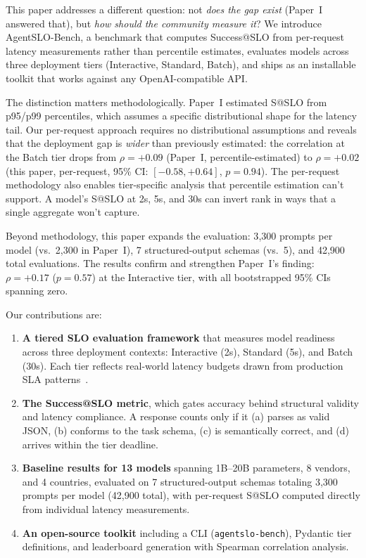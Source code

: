 \documentclass[11pt]{article}
\begin{document}
This paper addresses a different question: not \emph{does the gap exist} (Paper~I answered that), but \emph{how should the community measure it}?  We introduce AgentSLO-Bench, a benchmark that computes Success@SLO from per-request latency measurements rather than percentile estimates, evaluates models across three deployment tiers (Interactive, Standard, Batch), and ships as an installable toolkit that works against any OpenAI-compatible API.

The distinction matters methodologically.  Paper~I estimated S@SLO from p95/p99 percentiles, which assumes a specific distributional shape for the latency tail.  Our per-request approach requires no distributional assumptions and reveals that the deployment gap is \emph{wider} than previously estimated: the correlation at the Batch tier drops from $\rho = +0.09$ (Paper~I, percentile-estimated) to $\rho = +0.02$ (this paper, per-request, 95\% CI: $[-0.58, +0.64]$, $p = 0.94$).  The per-request methodology also enables tier-specific analysis that percentile estimation can't support.  A model's S@SLO at 2s, 5s, and 30s can invert rank in ways that a single aggregate won't capture.

Beyond methodology, this paper expands the evaluation: 3{,}300 prompts per model (vs.\ 2{,}300 in Paper~I), 7 structured-output schemas (vs.\ 5), and 42{,}900 total evaluations.  The results confirm and strengthen Paper~I's finding: $\rho = +0.17$ ($p = 0.57$) at the Interactive tier, with all bootstrapped 95\% CIs spanning zero.

Our contributions are:

\begin{enumerate}[leftmargin=*]
\item \textbf{A tiered SLO evaluation framework} that measures model readiness across three deployment contexts: Interactive (2s), Standard (5s), and Batch (30s).  Each tier reflects real-world latency budgets drawn from production SLA patterns~\cite{dean2013tail, akamai2017performance}.

\item \textbf{The Success@SLO metric}, which gates accuracy behind structural validity and latency compliance.  A response counts only if it (a) parses as valid JSON, (b) conforms to the task schema, (c) is semantically correct, and (d) arrives within the tier deadline.

\item \textbf{Baseline results for 13 models} spanning 1B--20B parameters, 8 vendors, and 4 countries, evaluated on 7 structured-output schemas totaling 3{,}300 prompts per model (42{,}900 total), with per-request S@SLO computed directly from individual latency measurements.

\item \textbf{An open-source toolkit} including a CLI (\texttt{agentslo-bench}), Pydantic tier definitions, and leaderboard generation with Spearman correlation analysis.
\end{enumerate}
\end{document}
